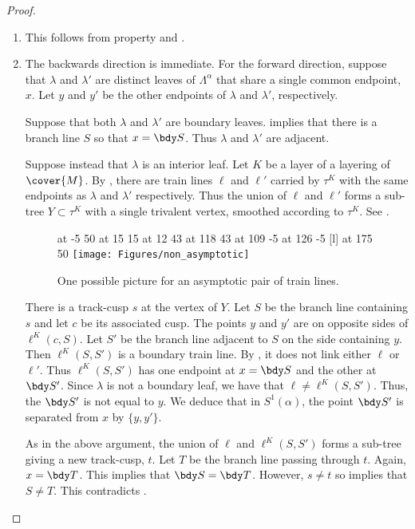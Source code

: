 \documentclass[12pt]{amsart}
\begin{document}
\begin{proof}
\begin{enumerate}
\item
This follows from property  and . 

\item
The backwards direction is immediate.  For the forward direction, suppose that $\lambda$ and $\lambda'$ are distinct leaves of $\Lambda^\alpha$ that share a single common endpoint, $x$.  Let $y$ and $y'$ be the other endpoints of $\lambda$ and $\lambda'$, respectively. 

Suppose that both $\lambda$ and $\lambda'$ are boundary leaves.   implies that there is a branch line $S$ so that $x=\bdy S$. Thus $\lambda$ and $\lambda'$ are adjacent.  

Suppose instead that $\lambda$ is an interior leaf.  Let $K$ be a layer of a layering of $\cover{M}$.  By , there are train lines $\ell$ and $\ell'$ carried by $\tau^K$ with the same endpoints as $\lambda$ and $\lambda'$ respectively.  Thus the union of $\ell$ and $\ell'$ forms a sub-tree $Y \subset \tau^K$ with a single trivalent vertex, smoothed according to $\tau^K$.  See .

\begin{figure}[htbp]
\small\hair 2pt
 at -5 50
 at 15 15
 at 12 43
 at 118 43
 at 109 -5
 at 126 -5
 [l] at 175 50
\endlabellist
\texttt{[image: Figures/non\_asymptotic]}
\caption{One possible picture for an asymptotic pair of train lines.}
\label{Fig:NonAsymptotic}
\end{figure}

There is a track-cusp $s$ at the vertex of $Y$. Let $S$ be the branch line containing $s$ and let $c$ be its associated cusp.  The points $y$ and $y'$ are on opposite sides of $\ell^K(c,S)$.  Let $S'$ be the branch line adjacent to $S$ on the side containing $y$.  Then $\ell^K(S, S')$ is a boundary train line. By , it does not link either $\ell$ or $\ell'$. Thus $\ell^K(S, S')$ has one endpoint at $x = \bdy S$ and the other at $\bdy S'$.  Since $\lambda$ is not a boundary leaf, we have that $\ell \neq \ell^K(S, S')$.  Thus, the $\bdy S'$ is not equal to $y$. We deduce that in $S^1(\alpha)$, the point $\bdy S'$ is separated from $x$ by $\{y,y'\}$. 

As in the above argument, the union of $\ell$ and $\ell^K(S, S')$ forms a sub-tree giving a new track-cusp, $t$. Let $T$ be the branch line passing through $t$.  Again, $x = \bdy T$.  This implies that $\bdy S = \bdy T$.  However, $s \neq t$ 
so  implies that $S \neq T$.  This contradicts . \qedhere
\end{enumerate}
\end{proof}
\end{document}
